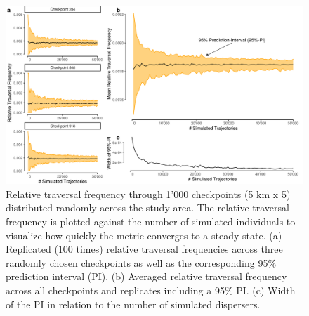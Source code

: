 \documentclass[abstract=on,10pt,a4paper,bibliography=totocnumbered]{article}
\begin{document}
\begin{figure}
  \begin{center}
    \includegraphics[width=\textwidth]{99_Convergence}
    \caption{Relative traversal frequency through 1'000 checkpoints (5 km x 5)
    distributed randomly across the study area. The relative traversal frequency
    is plotted against the number of simulated individuals to visualize how
    quickly the metric converges to a steady state. (a) Replicated (100 times)
    relative traversal frequencies across three randomly chosen checkpoints as
    well as the corresponding 95\% prediction interval (PI). (b) Averaged
    relative traversal frequency across all checkpoints and replicates including
    a 95\% PI. (c) Width of the PI in relation to the number of simulated
    dispersers.}
    \label{Convergence}
  \end{center}
\end{figure}

\end{document}

